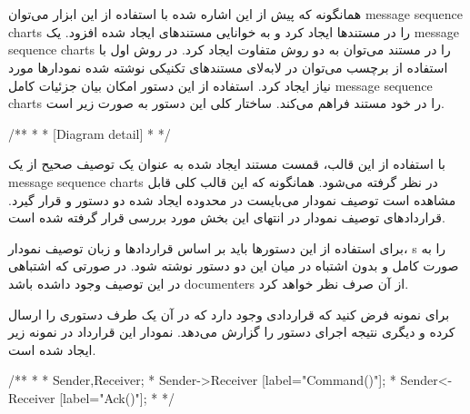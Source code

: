 %
% 
% 
% 
%
\section{}

همانگونه که پیش از این اشاره شده با استفاده از این ابزار می‌توان \glspl{message
sequence chart} را در مستند‌ها ایجاد کرد و به خوانایی مستند‌های ایجاد شده افزود.
یک \glspl{message sequence chart} را در مستند می‌توان به دو روش متفاوت ایجاد
کرد. در روش اول با استفاده از برچسب  می‌توان در لابه‌لای مستندهای تکنیکی
نوشته شده نمودارها مورد نیاز ایجاد کرد. استفاده از این دستور امکان بیان جزئیات
کامل \glspl{message sequence chart} را در خود مستند فراهم می‌کند. ساختار کلی این
دستور به صورت زیر است.
 
\begin{C++}
/**
 * \msc
 * [Diagram detail]
 * \endmsc
 */
\end{C++}

با استفاده از این قالب، قمست مستند ایجاد شده به عنوان یک توصیف صحیح از یک
\glspl{message sequence chart} در نظر گرفته می‌شود. همانگونه که این قالب کلی
قابل مشاهده است توصیف نمودار می‌بایست در محدوده ایجاد شده دو دستور  و
 قرار گیرد. قراردادهای توصیف نمودار در انتهای این بخش مورد بررسی قرار
گرفته شده است.

\begin{note}
برای استفاده از این دستورها باید بر اساس قراردادها و زبان توصیف نمودار، \glspl{}
را به صورت کامل و بدون اشتباه در میان این دو دستور نوشته شود. در صورتی که
اشتباهی در این توصیف وجود داشده باشد \glspl{documenter} از آن صرف نظر خواهد کرد.
\end{note}

برای نمونه فرض کنید که قراردادی وجود دارد که در آن یک طرف دستوری را ارسال کرده و
دیگری نتیجه اجرای دستور را گزارش می‌دهد. نمودار این قرارداد در نمونه زیر ایجاد
شده است.

\begin{C++}
/**
 * \msc
 * Sender,Receiver;
 * Sender->Receiver [label="Command()"];
 * Sender<-Receiver [label="Ack()"];
 * \endmsc
 */
\end{C++}

